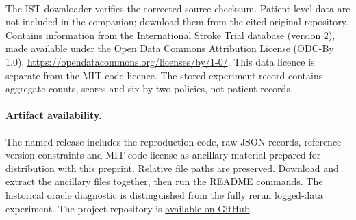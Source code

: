 \documentclass[11pt]{article}
\begin{document}
\begin{flushleft}\small
{}\\
\end{flushleft}
The IST downloader verifies the corrected source checksum. Patient-level data are not
included in the companion; download them from the cited original repository.
Contains information from the International Stroke Trial database (version 2),
made available under the Open Data Commons Attribution License (ODC-By 1.0),
\url{https://opendatacommons.org/licenses/by/1-0/}. This data licence is separate
from the MIT code licence. The stored experiment record contains aggregate
counts, scores and six-by-two policies, not patient records.
\paragraph{Artifact availability.}
The named release includes the reproduction code, raw JSON records,
reference-version constraints and MIT code license as ancillary material
prepared for distribution with this preprint. Relative file paths are
preserved. Download and extract the ancillary files together, then run the
README commands.
The historical oracle diagnostic is distinguished from the fully rerun
logged-data experiment. The project repository is
\href{https://github.com/soheilsayahvarg/model-based-rl-confounded-pomdps}{available on GitHub}.
\end{document}
